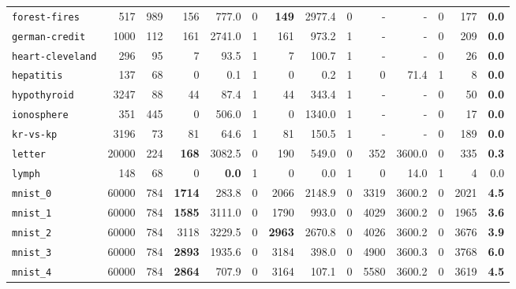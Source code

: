 \begin{tabular}{lccrrrrrrrrrrr}
\texttt{forest-fires} & \multicolumn{1}{r}{517} & \multicolumn{1}{r}{989}  & 156 & 777.0 & 0 & \textbf{149} & 2977.4 & 0 & - & - & 0 & 177 & \textbf{0.0}\\
\texttt{german-credit} & \multicolumn{1}{r}{1000} & \multicolumn{1}{r}{112}  & 161 & 2741.0 & 1 & 161 & 973.2 & 1 & - & - & 0 & 209 & \textbf{0.0}\\
\texttt{heart-cleveland} & \multicolumn{1}{r}{296} & \multicolumn{1}{r}{95}  & 7 & 93.5 & 1 & 7 & 100.7 & 1 & - & - & 0 & 26 & \textbf{0.0}\\
\texttt{hepatitis} & \multicolumn{1}{r}{137} & \multicolumn{1}{r}{68}  & 0 & 0.1 & 1 & 0 & 0.2 & 1 & 0 & 71.4 & 1 & 8 & \textbf{0.0}\\
\texttt{hypothyroid} & \multicolumn{1}{r}{3247} & \multicolumn{1}{r}{88}  & 44 & 87.4 & 1 & 44 & 343.4 & 1 & - & - & 0 & 50 & \textbf{0.0}\\
\texttt{ionosphere} & \multicolumn{1}{r}{351} & \multicolumn{1}{r}{445}  & 0 & 506.0 & 1 & 0 & 1340.0 & 1 & - & - & 0 & 17 & \textbf{0.0}\\
\texttt{kr-vs-kp} & \multicolumn{1}{r}{3196} & \multicolumn{1}{r}{73}  & 81 & 64.6 & 1 & 81 & 150.5 & 1 & - & - & 0 & 189 & \textbf{0.0}\\
\texttt{letter} & \multicolumn{1}{r}{20000} & \multicolumn{1}{r}{224}  & \textbf{168} & 3082.5 & 0 & 190 & 549.0 & 0 & 352 & 3600.0 & 0 & 335 & \textbf{0.3}\\
\texttt{lymph} & \multicolumn{1}{r}{148} & \multicolumn{1}{r}{68}  & 0 & \textbf{0.0} & 1 & 0 & 0.0 & 1 & 0 & 14.0 & 1 & 4 & 0.0\\
\texttt{mnist\_0} & \multicolumn{1}{r}{60000} & \multicolumn{1}{r}{784}  & \textbf{1714} & 283.8 & 0 & 2066 & 2148.9 & 0 & 3319 & 3600.2 & 0 & 2021 & \textbf{4.5}\\
\texttt{mnist\_1} & \multicolumn{1}{r}{60000} & \multicolumn{1}{r}{784}  & \textbf{1585} & 3111.0 & 0 & 1790 & 993.0 & 0 & 4029 & 3600.2 & 0 & 1965 & \textbf{3.6}\\
\texttt{mnist\_2} & \multicolumn{1}{r}{60000} & \multicolumn{1}{r}{784}  & 3118 & 3229.5 & 0 & \textbf{2963} & 2670.8 & 0 & 4026 & 3600.2 & 0 & 3676 & \textbf{3.9}\\
\texttt{mnist\_3} & \multicolumn{1}{r}{60000} & \multicolumn{1}{r}{784}  & \textbf{2893} & 1935.6 & 0 & 3184 & 398.0 & 0 & 4900 & 3600.3 & 0 & 3768 & \textbf{6.0}\\
\texttt{mnist\_4} & \multicolumn{1}{r}{60000} & \multicolumn{1}{r}{784}  & \textbf{2864} & 707.9 & 0 & 3164 & 107.1 & 0 & 5580 & 3600.2 & 0 & 3619 & \textbf{4.5}\\

\end{tabular}
